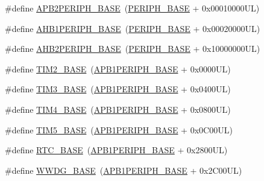 \begin{DoxyCompactItemize}
\item 
\#define \hyperlink{group___peripheral__memory__map_ga25b99d6065f1c8f751e78f43ade652cb}{A\+P\+B2\+P\+E\+R\+I\+P\+H\+\_\+\+B\+A\+SE}~(\hyperlink{group___peripheral__memory__map_ga9171f49478fa86d932f89e78e73b88b0}{P\+E\+R\+I\+P\+H\+\_\+\+B\+A\+SE} + 0x00010000\+U\+L)
\item 
\#define \hyperlink{group___peripheral__memory__map_ga811a9a4ca17f0a50354a9169541d56c4}{A\+H\+B1\+P\+E\+R\+I\+P\+H\+\_\+\+B\+A\+SE}~(\hyperlink{group___peripheral__memory__map_ga9171f49478fa86d932f89e78e73b88b0}{P\+E\+R\+I\+P\+H\+\_\+\+B\+A\+SE} + 0x00020000\+U\+L)
\item 
\#define \hyperlink{group___peripheral__memory__map_gaeedaa71d22a1948492365e2cd26cfd46}{A\+H\+B2\+P\+E\+R\+I\+P\+H\+\_\+\+B\+A\+SE}~(\hyperlink{group___peripheral__memory__map_ga9171f49478fa86d932f89e78e73b88b0}{P\+E\+R\+I\+P\+H\+\_\+\+B\+A\+SE} + 0x10000000\+U\+L)
\item 
\#define \hyperlink{group___peripheral__memory__map_ga00d0fe6ad532ab32f0f81cafca8d3aa5}{T\+I\+M2\+\_\+\+B\+A\+SE}~(\hyperlink{group___peripheral__memory__map_ga45666d911f39addd4c8c0a0ac3388cfb}{A\+P\+B1\+P\+E\+R\+I\+P\+H\+\_\+\+B\+A\+SE} + 0x0000\+U\+L)
\item 
\#define \hyperlink{group___peripheral__memory__map_gaf0c34a518f87e1e505cd2332e989564a}{T\+I\+M3\+\_\+\+B\+A\+SE}~(\hyperlink{group___peripheral__memory__map_ga45666d911f39addd4c8c0a0ac3388cfb}{A\+P\+B1\+P\+E\+R\+I\+P\+H\+\_\+\+B\+A\+SE} + 0x0400\+U\+L)
\item 
\#define \hyperlink{group___peripheral__memory__map_ga56e2d44b0002f316527b8913866a370d}{T\+I\+M4\+\_\+\+B\+A\+SE}~(\hyperlink{group___peripheral__memory__map_ga45666d911f39addd4c8c0a0ac3388cfb}{A\+P\+B1\+P\+E\+R\+I\+P\+H\+\_\+\+B\+A\+SE} + 0x0800\+U\+L)
\item 
\#define \hyperlink{group___peripheral__memory__map_ga3e1671477190d065ba7c944558336d7e}{T\+I\+M5\+\_\+\+B\+A\+SE}~(\hyperlink{group___peripheral__memory__map_ga45666d911f39addd4c8c0a0ac3388cfb}{A\+P\+B1\+P\+E\+R\+I\+P\+H\+\_\+\+B\+A\+SE} + 0x0\+C00\+U\+L)
\item 
\#define \hyperlink{group___peripheral__memory__map_ga4265e665d56225412e57a61d87417022}{R\+T\+C\+\_\+\+B\+A\+SE}~(\hyperlink{group___peripheral__memory__map_ga45666d911f39addd4c8c0a0ac3388cfb}{A\+P\+B1\+P\+E\+R\+I\+P\+H\+\_\+\+B\+A\+SE} + 0x2800\+U\+L)
\item 
\#define \hyperlink{group___peripheral__memory__map_ga9a5bf4728ab93dea5b569f5b972cbe62}{W\+W\+D\+G\+\_\+\+B\+A\+SE}~(\hyperlink{group___peripheral__memory__map_ga45666d911f39addd4c8c0a0ac3388cfb}{A\+P\+B1\+P\+E\+R\+I\+P\+H\+\_\+\+B\+A\+SE} + 0x2\+C00\+U\+L)

\end{DoxyCompactItemize}
